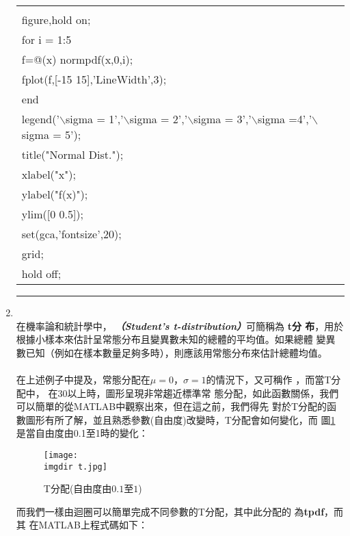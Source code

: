 \begin{enumerate}
{\begin{center}
{\begin{tabular}{p{}}
							\MJHmarker{\textbf{\color{darkblue}{MATLAB語法 :}}}\\		
							figure,hold on;\\
							for i = 1:5\\
    							\quad f=@(x) normpdf(x,0,i);\\
   							 	\quad fplot(f,[-15 15],'LineWidth',3);\\
							end\\
							legend('$\backslash$sigma = 1','$\backslash$sigma = 2','$								\backslash$sigma = 3','$\backslash$sigma =4','$\backslash								$sigma = 5');\\
							title("Normal Dist.");\\
							xlabel("x");\\
							ylabel("f(x)");\\
							ylim([0 0.5]);\\
							set(gca,'fontsize',20);\\
							grid;\\
							hold off;	\\	
						\end{tabular}
					}
					\end{center}
				}	
				\rule{\textwidth}{0.2pt}
				\item{\textbf{}\\
					在機率論和統計學中，\textbf{\color{darkblue}{司徒頓t-分布}									\emph{（Student's t-distribution）}}可簡稱為\textbf{\color{darkblue}						{t分	布}}，用於根據小樣本來估計呈常態分布且變異數未知的總體的平均值。如果總體						變異數已知（例如在樣本數量足夠多時），則應該用常態分布來估計總體均值。
					\\
					\\
					在上述例子中提及，常態分配在$\mu = 0$，$\sigma=1$的情況下，又可稱作							\textbf{\color{darkblue}{標準常態分配}}，而當T分配中，										\textbf{\color{darkblue}{自由度}}在$30$以上時，圖形呈現非常趨近標準常							態分配，如此函數關係，我們可以簡單的從MATLAB中觀察出來，但在這之前，我們得先						對於T分配的函數圖形有所了解，並且熟悉參數(自由度)改變時，T分配會如何變化，而						圖\ref{t}是當自由度由0.1至1時的變化：
					\begin{figure}[H]	
		 		 		\centering	 			 	 
   				 		\texttt{[image: \\imgdir t.jpg]} 
   			 			\caption{T分配(自由度由$0.1$至$1$)}   		
   			 			\label{t}   			 		 
					\end{figure}
					而我們一樣由迴圈可以簡單完成不同參數的T分配，其中此分配的										\textbf{}為\textbf{tpdf}，而其						在MATLAB上程式碼如下：
}
\end{enumerate}
